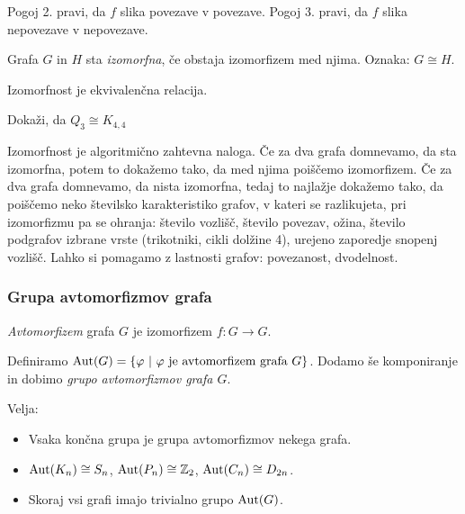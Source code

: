 \begin{opomba}
    Pogoj 2. pravi, da $f$ slika povezave v povezave. Pogoj 3. pravi, da $f$ slika nepovezave v nepovezave.
\end{opomba}

\begin{definicija}
    Grafa $G$ in $H$ sta \emph{izomorfna}, če obstaja izomorfizem med njima. Oznaka: $G \cong H$.
\end{definicija}

\begin{opomba}
    Izomorfnost je ekvivalenčna relacija.
\end{opomba}

\begin{primer}
    Dokaži, da $Q_3 \cong K_{4,4}$
\end{primer}

\begin{opomba}
    Izomorfnost je algoritmično zahtevna naloga. Če za dva grafa domnevamo, da sta izomorfna, potem to dokažemo tako, da med njima poiščemo izomorfizem. Če za dva grafa domnevamo, da nista izomorfna, tedaj to najlažje dokažemo tako, da poiščemo neko številsko karakteristiko grafov, v kateri se razlikujeta, pri izomorfizmu pa se ohranja: število vozlišč, število povezav, ožina, število podgrafov izbrane vrste (trikotniki, cikli dolžine 4), urejeno zaporedje snopenj vozlišč. Lahko si pomagamo z lastnosti grafov: povezanost, dvodelnost.
\end{opomba}

\subsubsection*{Grupa avtomorfizmov grafa}
\begin{definicija}
    \emph{Avtomorfizem} grafa $G$ je izomorfizem $f: G \to G$.
\end{definicija}

Definiramo $\operatorname{Aut} (G) = \left\{\varphi \ | \ \varphi \text{ je avtomorfizem grafa } G\right\}$. Dodamo še komponiranje in dobimo \emph{grupo avtomorfizmov grafa $G$}.

\begin{opomba}
    Velja:
    \begin{itemize}
        \item Vsaka končna grupa je grupa avtomorfizmov nekega grafa.
        \item $\operatorname{Aut}(K_n) \cong S_n$, $\operatorname{Aut}(P_n) \cong \mathbb{Z}_2$, $\operatorname{Aut}(C_n) \cong D_{2n}$.
        \item Skoraj vsi grafi imajo trivialno grupo $\operatorname{Aut}(G)$.
    \end{itemize}
\end{opomba}

